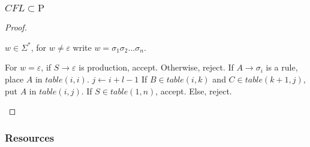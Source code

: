 \documentclass[notheorems]{beamer}
\theoremstyle{definition}
\theoremstyle{remark}
\newcommand{\pclass}{\text{P}}
\begin{document}
    \begin{frame}
        \frametitle{\(CFL \subset\pclass\)}

        \begin{proof}
            \begin{description} \footnotesize
                \item[Input:] \(w \in \Sigma^*\), for \(w \neq \varepsilon\) write \(w = \sigma_1\sigma_2...\sigma_n\).
                \item[Function:] \phantom{}
                    \begin{algorithmic}[1]
                        \State For \(w = \varepsilon\), if \(S \rightarrow \varepsilon\) is production, accept. Otherwise, reject.
                                \State If \(A \rightarrow \sigma_i\) is a rule, place \(A\) in \(table(i, i)\).
                            \EndFor
                        \EndFor
                         
                             
                                \State \(j \gets i + l - 1\) 
                                 
                                        \State If \(B \in table(i, k)\) and \(C \in table(k + 1, j)\), put \(A\) in \(table(i, j)\).
                                    \EndFor
                                \EndFor
                            \EndFor
                        \EndFor
                        \State If \(S \in table(1, n)\), accept. Else, reject.
                    \end{algorithmic}
            \end{description}
        \end{proof}

    \end{frame}

    \begin{frame}
        \frametitle{Resources}
        \nocite{*}
        \renewcommand{\refname}{\normalsize References} 
        
        
    \end{frame}
\end{document}

